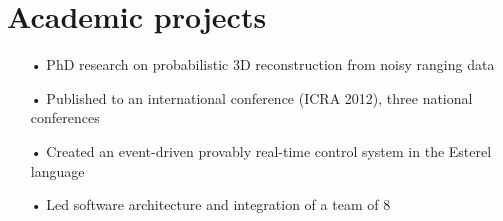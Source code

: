 \documentclass{cv}
\begin{document}
	\vspace{-0.5\baselineskip} %

	\section{Academic projects}
		\begin{position}[title={Incremental 3D reconstruction from time-of-flight data},%
		                 institution=Kyoto University,%
		                 country=Japan,%
		                 from=2010,%
		                 to=2012]
			\vspace{-\baselineskip} %
			\begin{itemize}
				\item[•] PhD research on probabilistic 3D reconstruction from noisy ranging data
				\item[•] Published to an international conference (ICRA 2012), three national conferences
			\end{itemize}
		\end{position}

		\vspace{0.2\baselineskip} %

		\begin{position}[title={SAUC-E: Autonomous Underwater Vehicle Competition},%
		                 institution={Université de Nice Sophia-Antipolis},%
		                 country=France,%
		                 from=2007,%
		                 to=2008]
			\vspace{-\baselineskip} %
			\begin{itemize}
				\item[•] Created an event-driven provably real-time control system in the Esterel language
				\item[•] Led software architecture and integration of a team of 8
			\end{itemize}
		\end{position}
\end{document}
